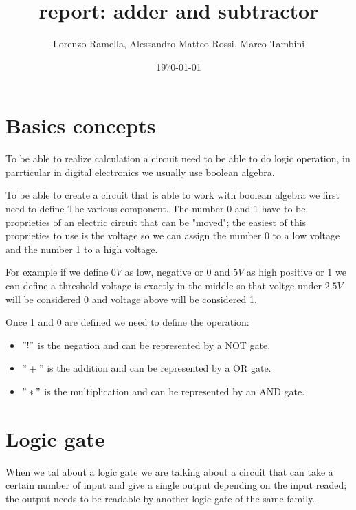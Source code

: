 \documentclass{article}
\title{report: adder and subtractor}
\author{Lorenzo Ramella, Alessandro Matteo Rossi, Marco Tambini}
\date{\today}
\begin{document}
\maketitle

\tableofcontents

\section{Basics concepts}

To be able to realize calculation a circuit need to be able to do logic operation, in parrticular in digital electronics we usually use boolean algebra. 

\vspace{3mm}

To be able to create a circuit that is able to work with boolean algebra we first need to define The various component.
The number 0 and 1 have to be proprieties of an electric circuit that can be "moved"; the easiest of this proprieties to use is the voltage so we can assign the number 0 to a low voltage and the number 1 to a high voltage. 

\vspace{3mm}

For example if we define $0V$ as low, negative or 0 and $5V$ as high positive or 1 we can define a threshold voltage is exactly in the middle so that voltge under $2.5 V$ will be considered 0 and voltage above will be considered 1.

\vspace{3mm}

Once 1 and 0 are defined we need to define the operation:

\begin{itemize}
\item $"!"$ is the negation and can be represented by a NOT gate.
\item $"+"$ is the addition and can be represented by a OR gate.
\item $"*"$ is the multiplication and can he represented by an AND gate.
\end{itemize}

\section{Logic gate}

When we tal about a logic gate we are talking about a circuit that can take a certain number of input and give a single output depending on the input readed; the output needs to be readable by another logic gate of the same family.
\end{document}
